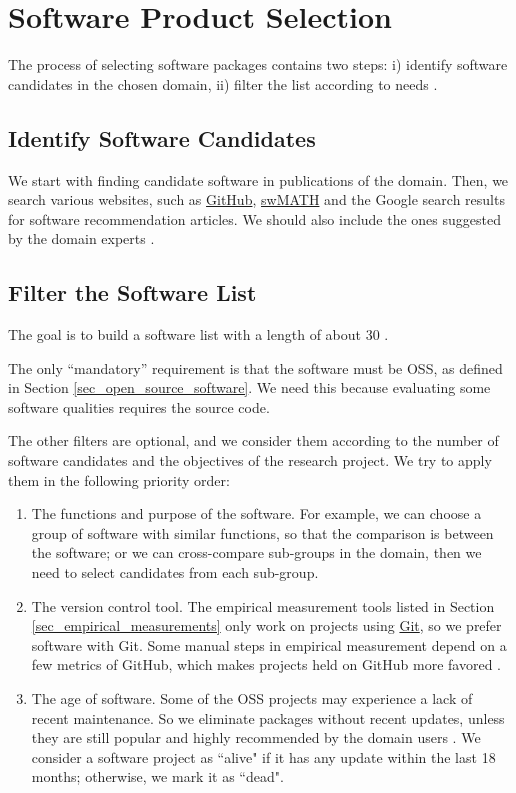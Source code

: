 \section{Software Product Selection}
\label{sec_software_selection}

The process of selecting software packages contains two steps: i) identify software candidates in the chosen domain, ii) filter the list according to needs \cite{SmithEtAl2021}.

\subsection{Identify Software Candidates}
\label{sec_identify_software_candidates}
We start with finding candidate software in publications of the domain. Then, we search various websites, such as \hyperlink{https://github.com/}{GitHub}, \hyperlink{https://swmath.org/}{swMATH} and the Google search results for software recommendation articles. We should also include the ones suggested by the domain experts \cite{SmithEtAl2021}.

\subsection{Filter the Software List}
\label{sec_filter_software_list}
The goal is to build a software list with a length of about 30 \cite{SmithEtAl2021}.

The only ``mandatory'' requirement is that the software must be OSS, as defined in Section \ref{sec_open_source_software}. We need this because evaluating some software qualities requires the source code.

The other filters are optional, and we consider them according to the number of software candidates and the objectives of the research project. We try to apply them in the following priority order:

\begin{enumerate}
\item The functions and purpose of the software. For example, we can choose a group of software with similar functions, so that the comparison is between the software; or we can cross-compare sub-groups in the domain, then we need to select candidates from each sub-group.

\item The version control tool. The empirical measurement tools listed in Section \ref{sec_empirical_measurements} only work on projects using \hyperlink{https://git-scm.com/}{Git}, so we prefer software with Git. Some manual steps in empirical measurement depend on a few metrics of GitHub, which makes projects held on GitHub more favored \cite{SmithEtAl2021}.

\item The age of software. Some of the OSS projects may experience a lack of recent maintenance. So we eliminate packages without recent updates, unless they are still popular and highly recommended by the domain users \cite{SmithEtAl2021}. We consider a software project as ``alive" if it has any update within the last 18 months; otherwise, we mark it as ``dead".
\end{enumerate}


